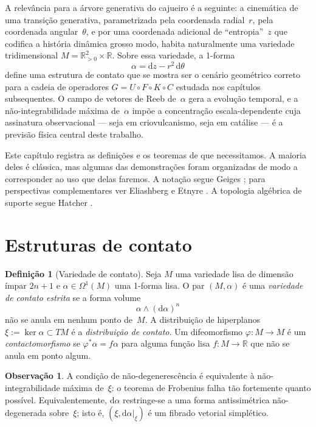\documentclass[12pt,a4paper,twoside]{book}
\theoremstyle{plain}
\theoremstyle{definition}
\theoremstyle{definition}
\newtheorem{definicao}[teorema]{Definição}
\newtheorem{observacao}[teorema]{Observação}
\newcommand{\R}{\mathbb{R}}
\newcommand{\dd}{\mathrm{d}}
\begin{document}
A relevância para a árvore generativa do cajueiro é a seguinte: a cinemática
de uma transição generativa, parametrizada pela coordenada radial~$r$,
pela coordenada angular~$\theta$, e por uma coordenada adicional de
``entropia''~$z$ que codifica a história dinâmica grosso modo, habita
naturalmente uma variedade tridimensional $M = \R^{2}_{>0} \times \R$.
Sobre essa variedade, a 1-forma
\[
  \alpha = \dd z - r^{2}\,\dd\theta
\]
define uma estrutura de contato que se mostra ser o cenário geométrico
correto para a cadeia de operadores $G = U \circ F \circ K \circ C$
estudada nos capítulos subsequentes. O campo de vetores de Reeb de~$\alpha$
gera a evolução temporal, e a não-integrabilidade máxima de~$\alpha$
impõe a concentração escala-dependente cuja assinatura observacional ---
seja em criovulcanismo, seja em catálise --- é a previsão física central
deste trabalho.

Este capítulo registra as definições e os teoremas de que necessitamos.
A maioria deles é clássica, mas algumas das demonstrações foram organizadas
de modo a corresponder ao uso que delas faremos. A notação segue Geiges
\cite{Geiges2008}; para perspectivas complementares ver Eliashberg
\cite{Eliashberg1992} e Etnyre \cite{Etnyre2003}. A topologia algébrica de
suporte segue Hatcher \cite{Hatcher}.

\section{Estruturas de contato}

\begin{definicao}[Variedade de contato]\label{def:variedade-contato}
Seja $M$ uma variedade lisa de dimensão ímpar $2n+1$ e
$\alpha \in \Omega^{1}(M)$ uma 1-forma lisa. O par $(M,\alpha)$ é uma
\emph{variedade de contato estrita} se a forma volume
\[
  \alpha \wedge (\dd\alpha)^{n}
\]
não se anula em nenhum ponto de~$M$. A distribuição de hiperplanos
$\xi := \ker\alpha \subset TM$ é a \emph{distribuição de contato}.
Um difeomorfismo $\varphi : M \to M$ é um \emph{contactomorfismo} se
$\varphi^{\ast}\alpha = f\alpha$ para alguma função lisa
$f : M \to \R$ que não se anula em ponto algum.
\end{definicao}

\begin{observacao}
A condição de não-degenerescência é equivalente à não-integrabilidade máxima
de~$\xi$: o teorema de Frobenius falha tão fortemente quanto possível.
Equivalentemente, $\dd\alpha$ restringe-se a uma forma antissimétrica
não-degenerada sobre~$\xi$; isto é, $(\xi,\dd\alpha|_{\xi})$ é um fibrado
vetorial simplético.
\end{observacao}
\end{document}
